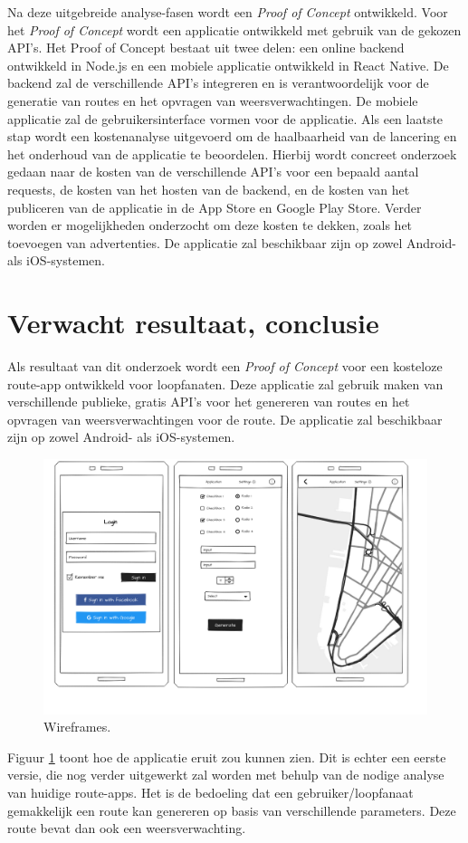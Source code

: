 Na deze uitgebreide analyse-fasen wordt een \emph{Proof of Concept} ontwikkeld.
Voor het \emph{Proof of Concept} wordt een applicatie ontwikkeld met gebruik van de gekozen API's.
Het Proof of Concept bestaat uit twee delen: een online backend ontwikkeld in Node.js
en een mobiele applicatie ontwikkeld in React Native. 
De backend zal de verschillende API's integreren en is verantwoordelijk voor 
de generatie van routes en het opvragen van weersverwachtingen.
De mobiele applicatie zal de gebruikersinterface vormen voor de applicatie.
Als een laatste stap wordt een kostenanalyse uitgevoerd om de haalbaarheid van de lancering en het onderhoud van de applicatie te beoordelen.
Hierbij wordt concreet onderzoek gedaan naar de kosten van de verschillende API's voor een bepaald aantal requests, 
de kosten van het hosten van de backend, en de kosten van het publiceren van de applicatie in de App Store en Google Play Store.
Verder worden er mogelijkheden onderzocht om deze kosten te dekken, zoals het toevoegen van advertenties.
De applicatie zal beschikbaar zijn op zowel Android- als iOS-systemen.

\section{Verwacht resultaat, conclusie}%
\label{sec:verwachte_resultaten}

Als resultaat van dit onderzoek wordt een \emph{Proof of Concept}
voor een kosteloze route-app ontwikkeld voor loopfanaten.
Deze applicatie zal gebruik maken van verschillende publieke, gratis API's voor het
genereren van routes en het opvragen van weersverwachtingen voor de route.
De applicatie zal beschikbaar zijn op zowel Android- als iOS-systemen.
\pagebreak

\begin{figure}[h!]
    \includegraphics[width=\linewidth]{./graphics/wireframes.png}
    \caption{Wireframes.}
    \label{fig:wireframes}
\end{figure}

Figuur \ref{fig:wireframes} toont hoe de applicatie eruit zou kunnen zien. 
Dit is echter een eerste versie,
die nog verder uitgewerkt zal worden met behulp van de nodige analyse van huidige route-apps.
Het is de bedoeling dat een gebruiker/loopfanaat gemakkelijk een route kan genereren op basis van verschillende parameters. Deze route bevat dan ook een weersverwachting. 